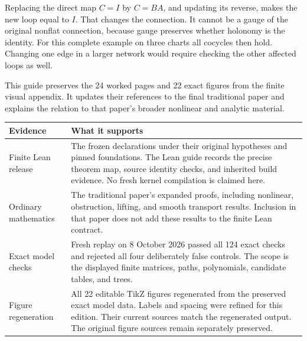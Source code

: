 Replacing the direct map $C=I$ by $C=BA$, and updating its reverse, makes the new loop equal to $I$. That changes the connection. It cannot be a gauge of the original nonflat connection, because gauge preserves whether holonomy is the identity. For this complete example on three charts all cocycles then hold. Changing one edge in a larger network would require checking the other affected loops as well.


This guide preserves the 24 worked pages and 22 exact figures from the finite visual appendix. It updates their references to the final traditional paper and explains the relation to that paper's broader nonlinear and analytic material.

{\small
\begin{tabularx}{\linewidth}{@{}p{.24\linewidth}Y@{}}\toprule
\textbf{Evidence} & \textbf{What it supports}\\\midrule
Finite Lean release & The frozen declarations under their original hypotheses and pinned foundations. The Lean guide records the precise theorem map, source identity checks, and inherited build evidence. No fresh kernel compilation is claimed here.\\
Ordinary mathematics & The traditional paper's expanded proofs, including nonlinear, obstruction, lifting, and smooth transport results. Inclusion in that paper does not add these results to the finite Lean contract.\\
Exact model checks & Fresh replay on 8 October 2026 passed all 124 exact checks and rejected all four deliberately false controls. The scope is the displayed finite matrices, paths, polynomials, candidate tables, and trees.\\
Figure regeneration & All 22 editable TikZ figures regenerated from the preserved exact model data. Labels and spacing were refined for this edition. Their current sources match the regenerated output. The original figure sources remain separately preserved.\\\bottomrule
\end{tabularx}}


